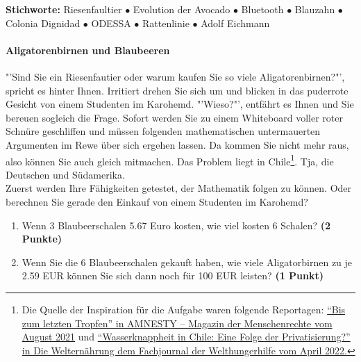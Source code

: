 \documentclass[a4paper, 9pt]{scrartcl}\usepackage[]{graphicx}\usepackage[]{xcolor}
\begin{document}
{\tiny\textbf{Stichworte:} Riesenfaultier $\bullet$ Evolution der Avocado $\bullet$ Bluetooth $ \bullet$ Blauzahn $\bullet$ Colonia Dignidad $\bullet$ ODESSA $\bullet$ Rattenlinie $\bullet$ Adolf Eichmann}


\paragraph{Aligatorenbirnen und Blaubeeren}



"'Sind Sie ein Riesenfautier oder warum kaufen Sie so viele
Aligatorenbirnen?"', spricht es hinter Ihnen. Irritiert drehen Sie sich um
und blicken in das puderrote Gesicht von einem Studenten im Karohemd. "'Wieso?"', entfährt es
Ihnen und Sie bereuen sogleich die Frage. Sofort werden Sie zu einem
Whiteboard voller roter Schnüre geschliffen und müssen folgenden
mathematischen untermauerten Argumenten im Rewe über sich ergehen
lassen. Da kommen Sie nicht mehr raus, also können Sie auch gleich
mitmachen. Das Problem liegt in Chile\footnote{Die Quelle der Inspiration
  für die Aufgabe waren folgende Reportagen:
  \href{https://www.amnesty.ch/de/ueber-amnesty/publikationen/magazin-amnesty/2021-3/bis-zum-letzten-tropfen}{"`Bis
  zum letzten Tropfen"' in AMNESTY – Magazin der Menschenrechte vom August
  2021} und
\href{https://www.welthungerhilfe.de/welternaehrung/rubriken/klima-ressourcen/wassernot-in-chile-eine-folge-der-privatisierung}{"`Wasserknappheit
  in Chile: Eine Folge der Privatisierung?"' in Die Welternährung dem
  Fachjournal der Welthungerhilfe vom April 2022.}}. Tja, die Deutschen und Südamerika.\\

Zuerst werden Ihre Fähigkeiten getestet, der Mathematik folgen zu können. Oder berechnen Sie gerade den Einkauf von einem Studenten im Karohemd?\\

\begin{enumerate}
\item Wenn 3 Blaubeerschalen 5.67 Euro kosten,  wie viel kosten 6 Schalen? \textbf{(2 Punkte)}
\item Wenn Sie die 6 Blaubeerschalen gekauft haben, wie viele Aligatorbirnen zu je 2.59 EUR können Sie sich dann noch für 100 EUR leisten? \textbf{(1 Punkt)}
\end{enumerate}
\end{document}
